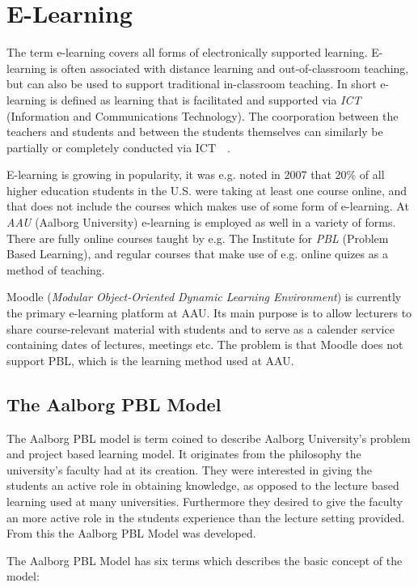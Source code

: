 \section{E-Learning}
The term e-learning covers all forms of electronically supported learning. E-learning is often associated with distance learning and out-of-classroom teaching, but can also be used to support traditional in-classroom teaching. In short e-learning is defined as learning that is facilitated and supported via \emph{ICT} (Information and Communications Technology). The coorporation between the teachers and students and between the students themselves can similarly be partially or completely conducted via ICT~\citep{def_e-learning1}~\citep{def_e-learning2}.

E-learning is growing in popularity, it was e.g. noted in 2007 that 20\% of all higher education students in the U.S. were taking at least one course online, and that does not include the courses which makes use of some form of e-learning.	At \emph{AAU} (Aalborg University) e-learning is employed as well in a variety of forms. There are fully online courses taught by e.g. The Institute for \emph{PBL} (Problem Based Learning)\cite{mpbl}, and regular courses that make use of e.g. online quizes as a method of teaching. 

Moodle (\emph{Modular Object-Oriented Dynamic Learning Environment}) \citep{moodle} is currently the primary e-learning platform at AAU. Its main purpose is to allow lecturers to share course-relevant material with students and to serve as a calender service containing dates of lectures, meetings etc. The problem is that Moodle does not support PBL, which is the learning method used at AAU.

\subsection{The Aalborg PBL Model}
The Aalborg PBL model is term coined to describe Aalborg University's problem and project based learning model. It originates from the philosophy the university's faculty had at its creation. They were interested in giving the students an active role in obtaining knowledge, as opposed to the lecture based learning used at many universities. Furthermore they desired to give the faculty an more active role in the students experience than the lecture setting provided. From this the Aalborg PBL Model was developed.

The Aalborg PBL Model has six terms which describes the basic concept of the model:

